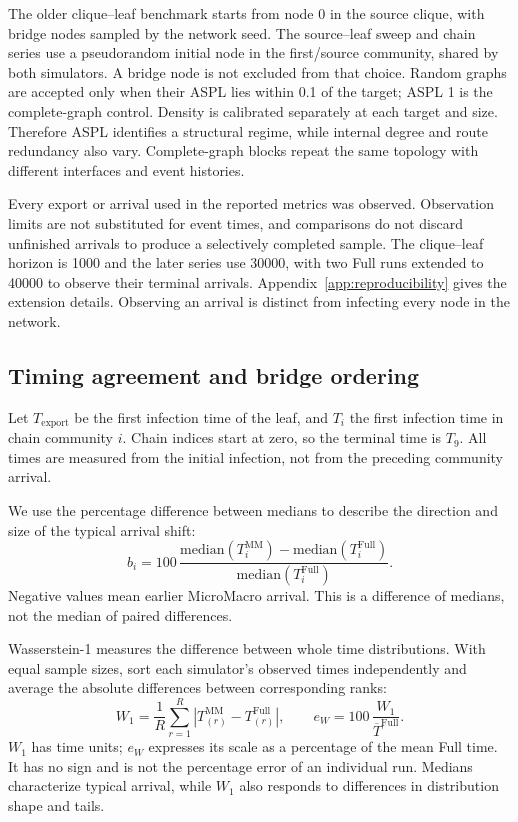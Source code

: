 \documentclass[a4paper,fleqn]{cas-sc}
\begin{document}
The older clique--leaf benchmark starts from node 0 in the source clique, with bridge nodes sampled by the network seed. The source--leaf sweep and chain series use a pseudorandom initial node in the first/source community, shared by both simulators. A bridge node is not excluded from that choice. Random graphs are accepted only when their ASPL lies within 0.1 of the target; ASPL 1 is the complete-graph control. Density is calibrated separately at each target and size. Therefore ASPL identifies a structural regime, while internal degree and route redundancy also vary. Complete-graph blocks repeat the same topology with different interfaces and event histories.

Every export or arrival used in the reported metrics was observed. Observation limits are not substituted for event times, and comparisons do not discard unfinished arrivals to produce a selectively completed sample. The clique--leaf horizon is 1000 and the later series use 30000, with two Full runs extended to 40000 to observe their terminal arrivals. Appendix~\ref{app:reproducibility} gives the extension details. Observing an arrival is distinct from infecting every node in the network.

\subsection{Timing agreement and bridge ordering}

Let $T_{\mathrm{export}}$ be the first infection time of the leaf, and $T_i$ the first infection time in chain community $i$. Chain indices start at zero, so the terminal time is $T_9$. All times are measured from the initial infection, not from the preceding community arrival.

We use the percentage difference between medians to describe the direction and size of the typical arrival shift:
\[
b_i=100\,\frac{\mathrm{median}(T_i^{\mathrm{MM}})
                    -\mathrm{median}(T_i^{\mathrm{Full}})}
                   {\mathrm{median}(T_i^{\mathrm{Full}})}.
\]
Negative values mean earlier MicroMacro arrival. This is a difference of medians, not the median of paired differences.

Wasserstein-1 measures the difference between whole time distributions. With equal sample sizes, sort each simulator's observed times independently and average the absolute differences between corresponding ranks:
\[
W_1=\frac{1}{R}\sum_{r=1}^R
          \left|T_{(r)}^{\mathrm{MM}}-T_{(r)}^{\mathrm{Full}}\right|,
\qquad
e_W=100\,\frac{W_1}{\overline T^{\mathrm{Full}}}.
\]
$W_1$ has time units; $e_W$ expresses its scale as a percentage of the mean Full time. It has no sign and is not the percentage error of an individual run. Medians characterize typical arrival, while $W_1$ also responds to differences in distribution shape and tails.
\end{document}
